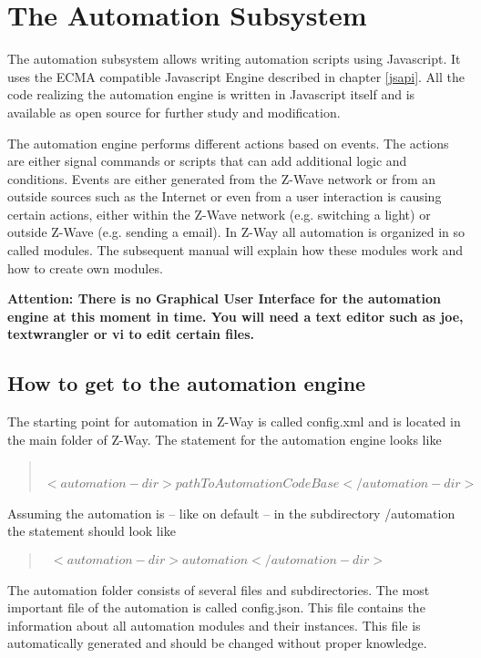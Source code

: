 \chapter{The Automation Subsystem}
\label{automation}

The automation subsystem allows writing automation scripts using Javascript. It uses the 
ECMA compatible Javascript Engine described in chapter \ref{jsapi}.
All the code realizing the automation engine is written in Javascript itself and is 
available as open source for further study and modification.

The automation engine performs different actions based on events.  The actions are either 
signal commands or scripts that can add additional logic and conditions.
Events are  either generated 
from the Z-Wave network or from an outside sources such as the Internet or even from a 
user interaction is causing certain actions, either within the Z-Wave network (e.g. 
switching a light) or outside Z-Wave (e.g. sending a email). In Z-Way all automation 
is organized in so called modules. The subsequent manual will explain how these 
modules work and how to create own modules.

{\bf Attention: There is no Graphical User Interface for the automation engine at this 
moment in time. You will need a text editor such as joe, textwrangler or vi to edit 
certain files. }

\section{How to get to the automation engine}

The starting point for automation in Z-Way is called config.xml and is located in the main 
folder of Z-Way. The statement for the automation engine looks like

\begin{quote}
{\tt  
$<automation-dir>pathToAutomationCodeBase</automation-dir>$
}
\end{quote}
Assuming the automation is – like on default – in the subdirectory /automation the 
statement should look like

\begin{quote}
{\tt  
$<automation-dir>automation </automation-dir>$
}
\end{quote}

The automation folder consists of several files and subdirectories. The most important 
file of the automation is called config.json. This file contains the information 
about all automation modules and their instances. This file is automatically generated and 
should be changed without proper knowledge.


